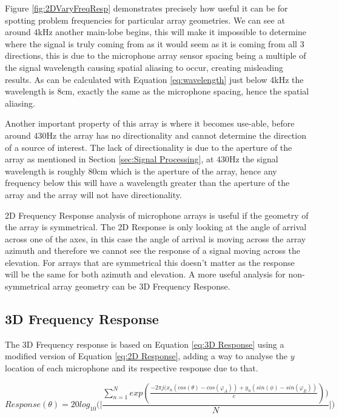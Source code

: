 \documentclass{UoNMCHA}
\numberwithin{equation}{section}
\begin{document}
    Figure \ref{fig:2DVaryFreqResp} demonstrates precisely how useful it can be for spotting problem frequencies for particular array geometries. We can see at around $4$kHz another main-lobe begins, this will make it impossible to determine where the signal is truly coming from as it would seem as it is coming from all 3 directions, this is due to the microphone array sensor spacing being a multiple of the signal wavelength causing spatial aliasing to occur, creating misleading results. As can be calculated with Equation \ref{eq:wavelength} just below 4kHz the wavelength is 8cm, exactly the same as the microphone spacing, hence the spatial aliasing.
    
    Another important property of this array is where it becomes use-able, before around $430$Hz the array has no directionality and cannot determine the direction of a source of interest. The lack of directionality is due to the aperture of the array as mentioned in Section \ref{sec:Signal Processing}, at $430$Hz the signal wavelength is roughly 80cm which is the aperture of the array, hence any frequency below this will have a wavelength greater than the aperture of the array and the array will not have directionality.
    
    2D Frequency Response analysis of microphone arrays is useful if the geometry of the array is symmetrical. The 2D Response is only looking at the angle of arrival across one of the axes, in this case the angle of arrival is moving across the array azimuth and therefore we cannot see the response of a signal moving across the elevation. For arrays that are symmetrical this doesn't matter as the response will be the same for both azimuth and elevation. A more useful analysis for non-symmetrical array geometry can be 3D Frequency Response.
\subsection{3D Frequency Response} \label{sec:3D Freq Response}
    The 3D Frequency response is based on Equation \ref{eq:3D Response} using a modified version of Equation \ref{eq:2D Response}, adding a way to analyse the $y$ location of each microphone and its respective response due to that.
    
    \begin{equation}
        Response(\theta) = 20log_{10} \Big( \Big|\frac{\sum_{n=1}^N exp(\frac{-2\pi j(x_n(cos(\theta)-cos(\varphi_A))+y_n(sin(\phi)-sin(\varphi_E))}{c}))}{N}\Big| \Big)
        \label{eq:3D Response}
    \end{equation}
    
\end{document}
